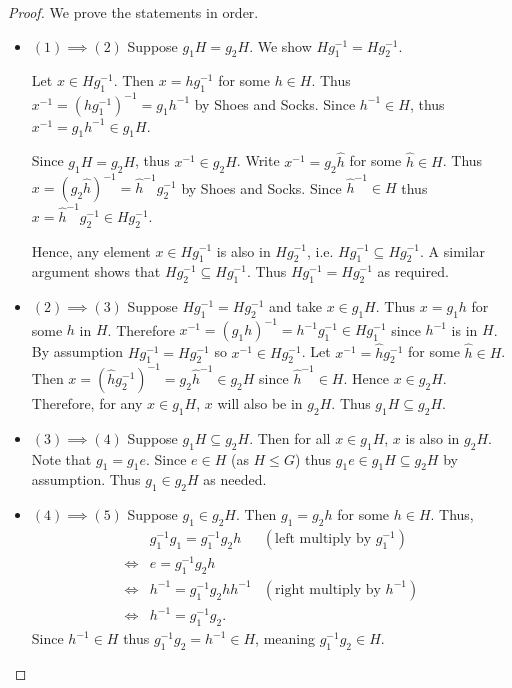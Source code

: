 \begin{proof}
    We prove the statements in order.

    \begin{itemize}
        \item $\boxed{(1) \implies (2)}$ Suppose $g_1H = g_2H$. We show $Hg_1^{-1} = Hg_2^{-1}$.

        Let $x \in Hg_1^{-1}$. Then $x = hg_1^{-1}$ for some $h \in H$. Thus $x^{-1} = \left(hg_1^{-1}\right)^{-1} = g_1h^{-1}$ by Shoes and Socks. Since $h^{-1} \in H$, thus $x^{-1} = g_1h^{-1} \in g_1H$.

        Since $g_1H = g_2H$, thus $x^{-1} \in g_2H$. Write $x^{-1} = g_2\hat{h}$ for some $\hat{h} \in H$. Thus $x = (g_2\hat{h})^{-1} = \hat{h}^{-1}g_2^{-1}$ by Shoes and Socks. Since $\hat{h}^{-1} \in H$ thus $x = \hat{h}^{-1}g_2^{-1} \in Hg_2^{-1}$.

        Hence, any element $x \in Hg_1^{-1}$ is also in $Hg_2^{-1}$, i.e. $Hg_1^{-1} \subseteq Hg_2^{-1}$. A similar argument shows that $Hg_2^{-1} \subseteq Hg_1^{-1}$. Thus $Hg_1^{-1} = Hg_2^{-1}$ as required.

        \item $\boxed{(2) \implies (3)}$ Suppose $Hg_1^{-1} = Hg_2^{-1}$ and take $x \in g_1H$. Thus $x = g_1h$ for some $h$ in $H$. Therefore $x^{-1} = (g_1h)^{-1} = h^{-1}g_1^{-1} \in Hg_1^{-1}$ since $h^{-1}$ is in $H$. By assumption $Hg_1^{-1} = Hg_2^{-1}$ so $x^{-1} \in Hg_2^{-1}$. Let $x^{-1} = \hat{h}g_2^{-1}$ for some $\hat{h} \in H$. Then $x = \left(\hat{h}g_2^{-1}\right)^{-1} = g_2\hat{h}^{-1} \in g_2H$ since $\hat{h}^{-1} \in H$. Hence $x \in g_2H$. Therefore, for any $x \in g_1H$, $x$ will also be in $g_2H$. Thus $g_1H \subseteq g_2H$.

        \item $\boxed{(3) \implies (4)}$
        Suppose $g_1H \subseteq g_2H$. Then for all $x \in g_1H$, $x$ is also in $g_2H$. Note that $g_1 = g_1e$. Since $e \in H$ (as $H \leq G$) thus $g_1e \in g_1H \subseteq g_2H$ by assumption. Thus $g_1 \in g_2H$ as needed.

        \item $\boxed{(4) \implies (5)}$
        Suppose $g_1 \in g_2H$. Then $g_1 = g_2h$ for some $h \in H$. Thus,
        \begin{align*}
            &g_1^{-1}g_1 = g_1^{-1}g_2h & (\text{left multiply by } g_1^{-1})\\
            \iff&e = g_1^{-1}g_2h\\
            \iff&h^{-1} = g_1^{-1}g_2hh^{-1} & (\text{right multiply by } h^{-1})\\
            \iff&h^{-1} = g_1^{-1}g_2.
        \end{align*}
        Since $h^{-1} \in H$ thus $g_1^{-1}g_2 = h^{-1} \in H$, meaning $g_1^{-1}g_2 \in H$.


\end{itemize}
\end{proof}
